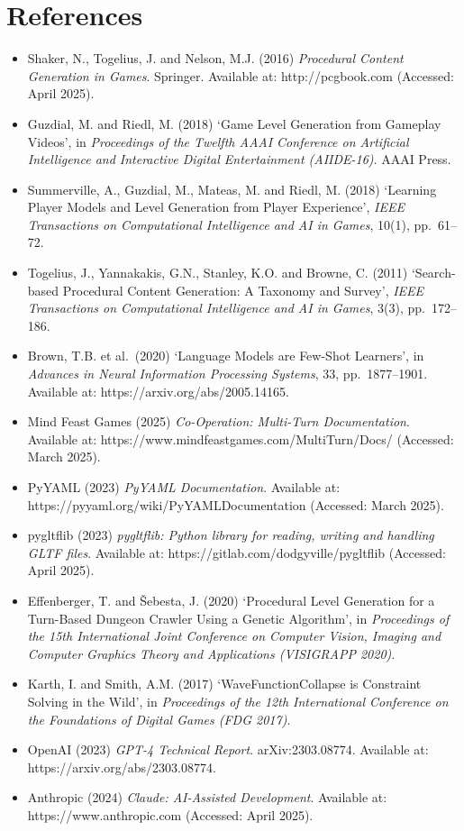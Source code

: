 \section{References}\label{references}

\begin{itemize}
\tightlist
\item
  Shaker, N., Togelius, J. and Nelson, M.J. (2016) \emph{Procedural
  Content Generation in Games}. Springer. Available at:
  http://pcgbook.com (Accessed: April 2025).
\item
  Guzdial, M. and Riedl, M. (2018) `Game Level Generation from Gameplay
  Videos', in \emph{Proceedings of the Twelfth AAAI Conference on
  Artificial Intelligence and Interactive Digital Entertainment
  (AIIDE-16)}. AAAI Press.
\item
  Summerville, A., Guzdial, M., Mateas, M. and Riedl, M. (2018)
  `Learning Player Models and Level Generation from Player Experience',
  \emph{IEEE Transactions on Computational Intelligence and AI in
  Games}, 10(1), pp.~61--72.
\item
  Togelius, J., Yannakakis, G.N., Stanley, K.O. and Browne, C. (2011)
  `Search-based Procedural Content Generation: A Taxonomy and Survey',
  \emph{IEEE Transactions on Computational Intelligence and AI in
  Games}, 3(3), pp.~172--186.
\item
  Brown, T.B. et al.~(2020) `Language Models are Few-Shot Learners', in
  \emph{Advances in Neural Information Processing Systems}, 33,
  pp.~1877--1901. Available at: https://arxiv.org/abs/2005.14165.
\item
  Mind Feast Games (2025) \emph{Co-Operation: Multi-Turn Documentation}.
  Available at: https://www.mindfeastgames.com/MultiTurn/Docs/
  (Accessed: March 2025).
\item
  PyYAML (2023) \emph{PyYAML Documentation}. Available at:
  https://pyyaml.org/wiki/PyYAMLDocumentation (Accessed: March 2025).
\item
  pygltflib (2023) \emph{pygltflib: Python library for reading, writing
  and handling GLTF files}. Available at:
  https://gitlab.com/dodgyville/pygltflib (Accessed: April 2025).
\item
  Effenberger, T. and Šebesta, J. (2020) `Procedural Level Generation
  for a Turn-Based Dungeon Crawler Using a Genetic Algorithm', in
  \emph{Proceedings of the 15th International Joint Conference on
  Computer Vision, Imaging and Computer Graphics Theory and Applications
  (VISIGRAPP 2020)}.
\item
  Karth, I. and Smith, A.M. (2017) `WaveFunctionCollapse is Constraint
  Solving in the Wild', in \emph{Proceedings of the 12th International
  Conference on the Foundations of Digital Games (FDG 2017)}.
\item
  OpenAI (2023) \emph{GPT-4 Technical Report}. arXiv:2303.08774.
  Available at: https://arxiv.org/abs/2303.08774.
\item
  Anthropic (2024) \emph{Claude: AI-Assisted Development}. Available at:
  https://www.anthropic.com (Accessed: April 2025).
\end{itemize}

